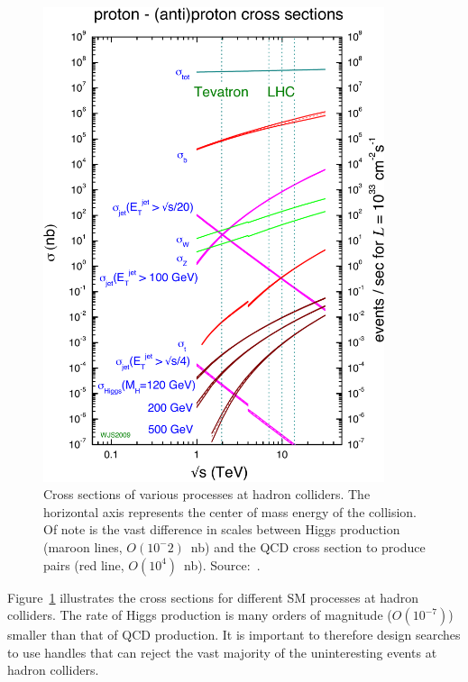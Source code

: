 \begin{figure}
  \centering
  \includegraphics[width=100mm,angle=00]{theory_chapter/figures/collider_crosssections.pdf}
  \caption[Cross sections of interest at hadron colliders]{Cross sections of
  various processes at hadron colliders.  The horizontal axis represents the
  center of mass energy of the collision.  Of note is the vast difference in
  scales between Higgs production (maroon lines, $O(10^-2)$~nb) and the QCD
  cross section to produce \bbbar pairs (red line, $O(10^4)$~nb).
  Source:~\cite{MSTWXSectionPlots}.} 
  \label{fig:HadronColliderCrossSections}
\end{figure}
Figure~\ref{fig:HadronColliderCrossSections} illustrates the cross sections for
different SM processes at hadron colliders.  The rate of Higgs production is
many orders of magnitude ($O(10^{-7})$) smaller than that of QCD production.  It
is important to therefore design searches to use handles that can reject the
vast majority of the uninteresting events at hadron colliders.  

